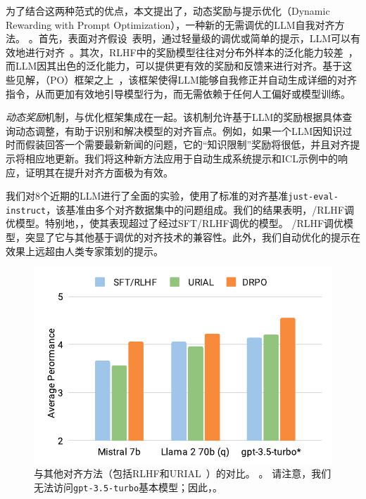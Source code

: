 为了结合这两种范式的优点，本文提出了\ours，动态奖励与提示优化（Dynamic Rewarding with Prompt Optimization），一种新的无需调优的LLM自我对齐方法。 。首先，表面对齐假设~\cite{zhou2024lima}表明，通过轻量级的调优或简单的提示，LLM可以有效地进行对齐~\cite{Lin2024ReAlign, zhao2024context}。其次，RLHF中的奖励模型往往对分布外样本的泛化能力较差~\cite{burns2023weak}，而LLM因其出色的泛化能力，可以提供更有效的奖励和反馈来进行对齐。基于这些见解，（PO）框架之上~\cite{pryzant2023automatic, hao2023reasoning, wang2023promptagent}，该框架使得LLM能够自我修正并自动生成详细的对齐指令，从而更加有效地引导模型行为，而无需依赖于任何人工偏好或模型训练。

\textit{动态奖励}机制，与优化框架集成在一起。该机制允许基于LLM的奖励根据具体查询动态调整，有助于识别和解决模型的对齐盲点。例如，如果一个LLM因知识过时而假装回答一个需要最新新闻的问题，它的“知识限制”奖励将很低，并且对齐提示将相应地更新。我们将这种新方法应用于自动生成系统提示和ICL示例中的响应，证明其在提升对齐方面极为有效。

我们对8个近期的LLM进行了全面的实验，使用了标准的对齐基准\texttt{just-eval-instruct}，该基准由多个对齐数据集中的问题组成。我们的结果表明，/RLHF调优模型。特别地，，使其表现超过了经过SFT/RLHF调优的模型。 /RLHF调优模型，突显了它与其他基于调优的对齐技术的兼容性。此外，我们自动优化的提示在效果上远超由人类专家策划的提示。

\begin{figure}
    \centering
    \includegraphics[width=1.0\linewidth]{images/method_comparison_column_chart_white_bg.pdf}
    \vspace{-15pt}
    \caption{与其他对齐方法（包括RLHF和URIAL~\cite{Lin2024ReAlign}）的对比。 。
    请注意，我们无法访问\texttt{gpt-3.5-turbo}基本模型；因此，。}
    \label{fig:overall_comparison_chart}
    \vspace{-15pt}
\end{figure}
